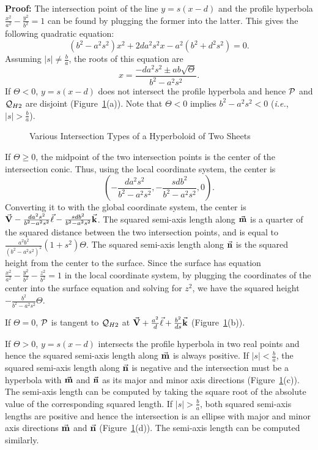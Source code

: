 {\bf Proof:}  The intersection point of the line $y=s(x-d)$ and the profile
hyperbola $\frac{x^2}{a^2}-\frac{y^2}{b^2}=1$ can be found by plugging the
former into the latter.  This gives the following quadratic equation:
\begin{equation}
\label{eqn:hy2-2degree}
     (b^2-a^2s^2)x^2+2da^2s^2x-a^2(b^2+d^2s^2)=0.
\end{equation}
Assuming $|s|\neq\frac{b}{a}$, the roots of this equation are
\[ x=\frac{-da^2s^2\pm ab\sqrt{\Theta}}{b^2-a^2s^2}. \]
If $\Theta<0$, $y=s(x-d)$ does not intersect the profile hyperbola and hence
${\cal P}$ and ${\cal Q}_{H2}$ are disjoint (Figure~\ref{fig:hy2}(a)).
Note that $\Theta<0$ implies $b^2-a^2s^2<0$ ({\em i.e.}, $|s|>\frac{b}{a}$).
\begin{figure}
\vspace{9.5cm}
\caption{Various Intersection Types of a Hyperboloid of Two Sheets}
\label{fig:hy2}
\end{figure}

     If $\Theta\geq 0$, the midpoint of the two intersection points is the
center of the intersection conic.  Thus, using the local coordinate system,
the center is
\[ \left(-\frac{da^2s^2}{b^2-a^2s^2},-\frac{sdb^2}{b^2-a^2s^2},0\right). \]
Converting it to with the global coordinate system, the center is
$\vec{\bf V}-\frac{da^2s^2}{b^2-a^2s^2}\vec{\bf \ell}
-\frac{sdb^2}{b^2-a^2s^2}\vec{\bf k}$.  The squared semi-axis length along
$\vec{\bf m}$ is a quarter of the squared distance between the two
intersection points, and is equal to
$\frac{a^2b^2}{(b^2-a^2s^2)^2}(1+s^2)\Theta$.  The squared semi-axis length
along $\vec{\bf n}$ is the squared height from the center to the surface.
Since the surface has equation
$\frac{x^2}{a^2}-\frac{y^2}{b^2}-\frac{z^2}{b^2}=1$ in the local coordinate
system, by plugging the coordinates of the center into the surface equation and
solving for $z^2$, we have the squared height $-\frac{b^2}{b^2-a^2s^2}\Theta$.

     If $\Theta=0$, ${\cal P}$ is tangent to ${\cal Q}_{H2}$ at
$\vec{\bf V}+\frac{a^2}{d}\vec{\bf \ell}+\frac{b^2}{ds}\vec{\bf k}$
(Figure~\ref{fig:hy2}(b)).

     If $\Theta>0$, $y=s(x-d)$ intersects the profile hyperbola in two real
points and hence the squared semi-axis length along $\vec{\bf m}$ is always
positive.  If $|s|<\frac{b}{a}$, the squared semi-axis length along $\vec{\bf n}$
is negative and the intersection must be a hyperbola with $\vec{\bf m}$ and
$\vec{\bf n}$ as its major and minor axis directions (Figure~\ref{fig:hy2}(c)).
The semi-axis length can be computed by taking the square root of the absolute
value of the corresponding squared length.  If $|s|>\frac{b}{a}$, both squared
semi-axis lengths are positive and hence the intersection is an ellipse with
major and minor axis directions $\vec{\bf m}$ and $\vec{\bf n}$
(Figure~\ref{fig:hy2}(d)).  The semi-axis length can be computed similarly.

